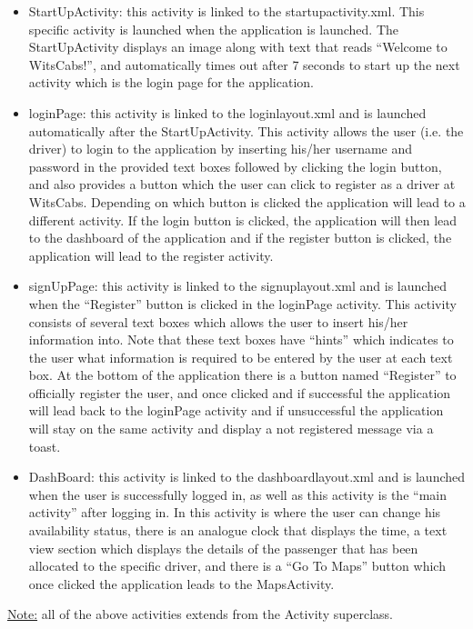 \documentclass[a4paper,12pt]{article}
\begin{document}
\begin{itemize}
\item StartUpActivity: this activity is linked to the startupactivity.xml. This specific activity is launched
when the application is launched. The StartUpActivity displays an image along with text that
reads ``Welcome to WitsCabs!'', and automatically times out after 7 seconds to start up the next
activity which is the login page for the application.
\item loginPage: this activity is linked to the loginlayout.xml and is launched automatically after the
StartUpActivity. This activity allows the user (i.e. the driver) to login to the application by
inserting his/her username and password in the provided text boxes followed by clicking the
login button, and also provides a button which the user can click to register as a driver at
WitsCabs. Depending on which button is clicked the application will lead to a different activity. If
the login button is clicked, the application will then lead to the dashboard of the application and
if the register button is clicked, the application will lead to the register activity.
\item signUpPage: this activity is linked to the signuplayout.xml and is launched when the ``Register''
button is clicked in the loginPage activity. This activity consists of several text boxes which
allows the user to insert his/her information into. Note that these text boxes have ``hints'' which
indicates to the user what information is required to be entered by the user at each text box. At
the bottom of the application there is a button named ``Register'' to officially register the user, and once
clicked and if successful the application will lead back to the loginPage activity and if
unsuccessful the application will stay on the same activity and display a not registered message
via a toast.
\item DashBoard: this activity is linked to the dashboardlayout.xml and is launched when the user is
successfully logged in, as well as this activity is the ``main activity'' after logging in. In this activity
is where the user can change his availability status, there is an analogue clock that displays the
time, a text view section which displays the details of the passenger that has been allocated to
the specific driver, and there is a ``Go To Maps'' button which once clicked the application leads
to the MapsActivity.
\end{itemize}
\underline{Note:} all of the above activities extends from the Activity superclass.
\end{document}
